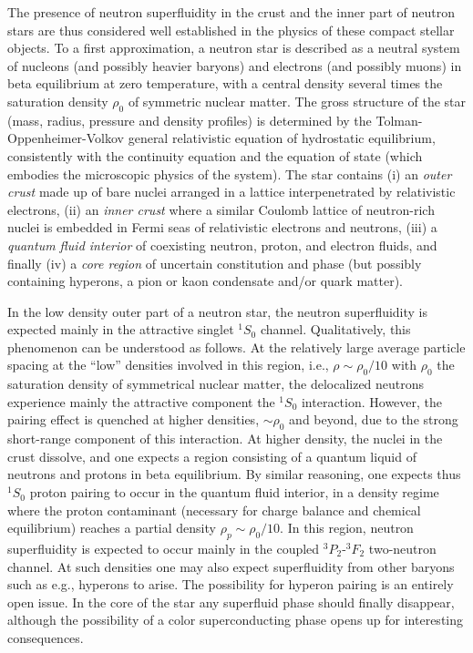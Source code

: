 \documentclass{svmult}
\begin{document}
The presence of neutron superfluidity in 
the crust and the inner part 
of neutron stars 
are thus considered well established 
in the physics of these compact stellar objects. 
To a first approximation, a neutron star 
is described as a neutral system of nucleons (and possibly heavier baryons) 
and electrons (and possibly muons) in beta equilibrium at zero temperature, 
with a central density several times the saturation density $\rho_0$ 
of symmetric nuclear matter. 
The gross structure of the star (mass, radius, pressure and density 
profiles) is determined by the Tolman-Oppenheimer-Volkov general 
relativistic equation of hydrostatic equilibrium, consistently with 
the continuity equation and the equation of state (which embodies the 
microscopic physics of the system).  The star contains (i) an {\it outer 
crust} made up of bare nuclei arranged in a lattice interpenetrated 
by relativistic electrons, (ii) an {\it inner crust} where a similar 
Coulomb lattice of neutron-rich nuclei is embedded in Fermi seas of 
relativistic electrons and neutrons, (iii) a {\it quantum fluid interior} 
of coexisting neutron, proton, and electron fluids, and finally 
(iv) a {\it core region} of uncertain constitution and phase (but 
possibly containing hyperons, a pion or kaon condensate and/or quark matter).

In the low density outer part of a neutron star, 
the neutron superfluidity is expected 
mainly in the attractive singlet $^1S_0$ channel. 
Qualitatively, this phenomenon can be understood
as follows.  At the relatively large average particle spacing at the 
``low'' densities involved in this region, i.e., $\rho \sim \rho_0/10$ 
with  $\rho_0$ the saturation density 
of symmetrical nuclear matter, 
the delocalized neutrons experience mainly the attractive component 
the $^1S_0$ interaction.   However, the pairing effect is quenched 
at higher densities, $\sim \rho_0$ and beyond, due to the strong 
short-range component of this interaction.  
At higher density, the nuclei in the crust dissolve, and one 
expects a region consisting of a quantum liquid of neutrons and 
protons in beta equilibrium. 
By similar reasoning, one 
expects thus $^1S_0$ proton pairing to occur in the quantum fluid interior, 
in a density regime where the proton contaminant (necessary for
charge balance and chemical equilibrium) reaches a partial 
density $\rho_p \sim \rho_0/10$. 
In this region, neutron superfluidity is expected to  
occur mainly in the coupled $^3P_2$-$^3F_2$ two-neutron channel. 
At such densities one may also expect superfluidity from 
other baryons such as e.g., 
hyperons to arise. The possibility for hyperon pairing is an entirely open
issue.
In the core of the star any superfluid 
phase should finally disappear, although the possibility of a
color superconducting phase opens up for interesting consequences.
\end{document}
